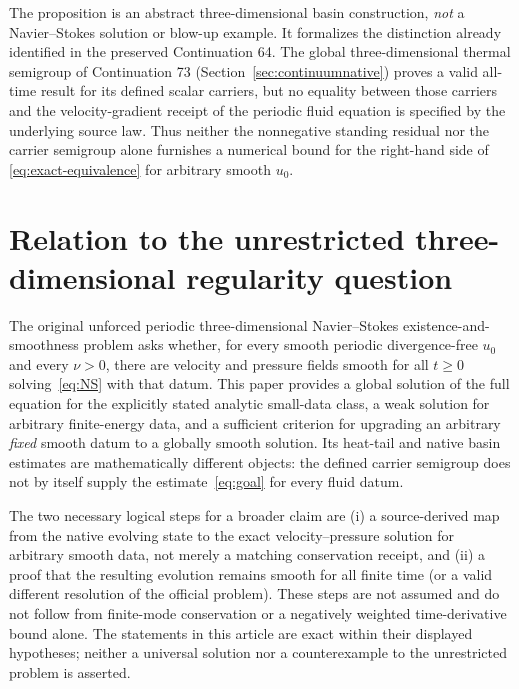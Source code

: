 \begin{remark}
The proposition is an abstract three-dimensional basin construction,
\emph{not} a Navier--Stokes solution or blow-up example. It formalizes
the distinction already identified in the preserved Continuation 64.
The global three-dimensional thermal semigroup of Continuation 73
(Section~\ref{sec:continuumnative}) proves a valid all-time result
for its defined scalar carriers, but no equality between those
carriers and the velocity-gradient receipt of the periodic fluid equation
is specified by the underlying source law. Thus neither the
nonnegative standing residual nor the carrier semigroup alone furnishes
a numerical bound for the right-hand side of
\eqref{eq:exact-equivalence} for arbitrary smooth $u_0$.
\end{remark}

\section{Relation to the unrestricted three-dimensional regularity question}
The original unforced periodic three-dimensional Navier--Stokes existence-and-smoothness problem asks whether, for every smooth periodic divergence-free $u_0$ and every $\nu>0$, there are velocity and pressure fields smooth for all $t\ge0$ solving~\eqref{eq:NS} with that datum. This paper provides a global solution of the full equation for the explicitly stated analytic small-data class, a weak solution for arbitrary finite-energy data, and a sufficient criterion for upgrading an arbitrary \emph{fixed} smooth datum to a globally smooth solution. Its heat-tail and native basin estimates are mathematically different objects: the defined carrier semigroup does not by itself supply the estimate~\eqref{eq:goal} for every fluid datum.

The two necessary logical steps for a broader claim are (i) a source-derived map from the native evolving state to the exact velocity--pressure solution for arbitrary smooth data, not merely a matching conservation receipt, and (ii) a proof that the resulting evolution remains smooth for all finite time (or a valid different resolution of the official problem). These steps are not assumed and do not follow from finite-mode conservation or a negatively weighted time-derivative bound alone. The statements in this article are exact within their displayed hypotheses; neither a universal solution nor a counterexample to the unrestricted problem is asserted.

